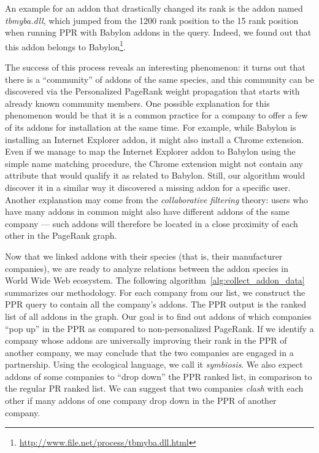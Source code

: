 \documentclass[11pt,oneside]{book}
\begin{document}
An example for an addon that drastically changed its rank is the addon named \emph{tbmyba.dll}, which jumped from the 1200 rank position to the 15 rank position when running PPR with Babylon addons in the query. Indeed, we found out that this addon belongs to Babylon\footnote{\url{http://www.file.net/process/tbmyba.dll.html}}.

The success of this process reveals an interesting phenomenon: it turns out that there is a ``community'' of addons of the same species, and this community can be discovered via the Personalized PageRank weight propagation that starts with already known community members. One possible explanation for this phenomenon would be that it is a common practice for a company to offer a few of its addons for installation at the same time. For example, while Babylon is installing an Internet Explorer addon, it might also install a Chrome extension. Even if we manage to map the Internet Explorer addon to Babylon using the simple name matching procedure, the Chrome extension might not contain any attribute that would qualify it as related to Babylon. Still, our algorithm would discover it in a similar way it discovered a missing addon for a specific user. 
Another explanation may come from the \emph{collaborative filtering} theory: users who have many addons in common might also have different addons of the same company --- such addons will therefore be located in a close proximity of each other in the PageRank graph.

Now that we linked addons with their species (that is, their manufacturer companies), we are ready to analyze relations between the addon species in World Wide Web ecosystem. The following algorithm~\autoref{alg:collect_addon_data} summarizes our methodology. 
For each company from our list, we construct the PPR query to contain all the company's addons. The PPR output is the ranked list of all addons in the graph. Our goal is to find out addons of which companies ``pop up'' in the PPR as compared to non-personalized PageRank. If we identify a company whose addons are universally improving their rank in the PPR of another company, we may conclude that the two companies are engaged in a partnership. Using the ecological language, we call it \emph{symbiosis}. We also expect addons of some companies to ``drop down'' the PPR ranked list, in comparison to the regular PR ranked list. We can suggest that two companies \emph{clash} with each other if many addons of one company drop down in the PPR of another company.
\end{document}
